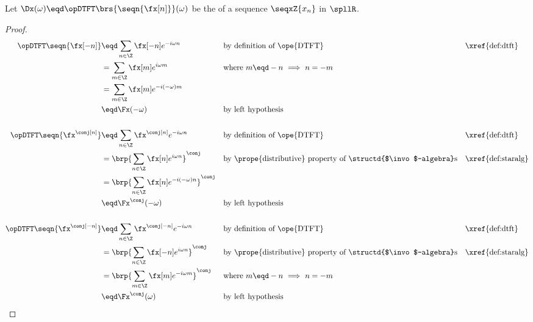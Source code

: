 \begin{theorem}
\label{thm:dtft_conjneg}
Let $\Dx(\omega)\eqd\opDTFT\brs{\seqn{\fx[n]}}(\omega)$ be the  
of a sequence $\seqxZ{x_n}$ in $\spllR$.
\end{theorem}
\begin{proof}
\begin{align*}
  \opDTFT\seqn{\fx[-n]}
    &\eqd \sum_{n\in\Z} \fx[-n] e^{-i\omega n}
    && \text{by definition of \ope{DTFT}}
    && \text{\xref{def:dtft}}
  \\&= \sum_{m\in\Z} \fx[m] e^{i\omega m}
     && \text{where $m\eqd-n$ $\implies$ $n=-m$}
  \\&= \sum_{m\in\Z} \fx[m] e^{-i(-\omega)m}
  \\&\eqd \Fx(-\omega)
    && \text{by left hypothesis}
    \\
    \\
  \opDTFT\seqn{\fx^\conj[n]}
    &\eqd \sum_{n\in\Z} \fx^\conj[n] e^{-i\omega n}
    && \text{by definition of \ope{DTFT}}
    && \text{\xref{def:dtft}}
  \\&= \brp{\sum_{n\in\Z} \fx[n] e^{i\omega n}}^\conj
     && \text{by \prope{distributive} property of \structd{$\invo$-algebra}s}
     && \text{\xref{def:staralg}}
  \\&= \brp{\sum_{n\in\Z} \fx[n] e^{-i(-\omega)n}}^\conj
  \\&\eqd \Fx^\conj(-\omega)
    && \text{by left hypothesis}
    \\
    \\
  \opDTFT\seqn{\fx^\conj[-n]}
    &\eqd \sum_{n\in\Z} \fx^\conj[-n] e^{-i\omega n}
    && \text{by definition of \ope{DTFT}}
    && \text{\xref{def:dtft}}
  \\&= \brp{\sum_{n\in\Z} \fx[-n] e^{i\omega n}}^\conj
     && \text{by \prope{distributive} property of \structd{$\invo$-algebra}s}
     && \text{\xref{def:staralg}}
  \\&= \brp{\sum_{m\in\Z} \fx[m] e^{-i\omega m}}^\conj
     && \text{where $m\eqd-n$ $\implies$ $n=-m$}
  \\&\eqd \Fx^\conj(\omega)
    && \text{by left hypothesis}
\end{align*}
\end{proof}

